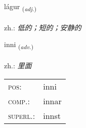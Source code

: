 \documentclass[frontgrid, backgrid]{flacards}\usepackage[]{graphicx}\usepackage[]{xcolor}
\begin{document}
\renewcommand{\flhead}{\vskip5pt \fboxsep=0pt {\small\bfseries\footnotesize Lýsingarorð | 形容词}}
\renewcommand{\fcfoot}{\vskip5pt \fboxsep=0pt \hspace{2pt}{\small\bfseries\footnotesize 1K}}

\renewcommand{\blhead}{\vskip5pt {\small\bfseries\footnotesize Lýsingarorð | 形容词 }}
\renewcommand{\bcfoot}{\vskip5pt \hspace{2pt}{\small\bfseries\footnotesize 1K}}


{lágur \small{\textsubscript{(\textit{adj.})}} \\[1ex] %
\textphonetic{[lauːɣʏr]} \\
zh.: \emph{低的；短的；安静的} \\  [2ex]
\renewcommand*{\arraystretch}{0.8}
}

\renewcommand{\flhead}{\vskip5pt \fboxsep=0pt {\small\bfseries\footnotesize Atviksorð | 副词}}
\renewcommand{\fcfoot}{\vskip5pt \fboxsep=0pt \hspace{2pt}{\small\bfseries\footnotesize 1K}}

\renewcommand{\blhead}{\vskip5pt {\small\bfseries\footnotesize Atviksorð | 副词 }}
\renewcommand{\bcfoot}{\vskip5pt \hspace{2pt}{\small\bfseries\footnotesize 1K}}


{inni \small{\textsubscript{(\textit{adv.})}} \\[1ex] %
\textphonetic{[ɪnɪ]} \\
zh.: \emph{里面} \\  [2ex]
\renewcommand*{\arraystretch}{0.8}
\begin{tabular}{ll}
\textsc{pos}: & inni \\ 
\textsc{comp.}: & innar \\ 
\textsc{superl.}: & innst \\
\end{tabular}
}
\end{document}
